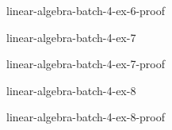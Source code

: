 \documentclass[preview]{standalone}
\begin{document}
\begin{snippetsolution}{linear-algebra-batch-4-ex-6-proof}{}
    \todo
\end{snippetsolution}

\begin{snippetexercise}{linear-algebra-batch-4-ex-7}{}
    \todo
\end{snippetexercise}

\begin{snippetsolution}{linear-algebra-batch-4-ex-7-proof}{}
    \todo
\end{snippetsolution}

\begin{snippetexercise}{linear-algebra-batch-4-ex-8}{}
    \todo
\end{snippetexercise}

\begin{snippetsolution}{linear-algebra-batch-4-ex-8-proof}{}
    \todo
\end{snippetsolution}
\end{document}
